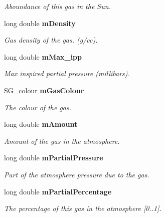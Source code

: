 \begin{CompactItemize}
\begin{CompactList}\small\item\em Aboundance of this gas in the Sun. \item\end{CompactList}\item 
long double {\bf m\-Density}\label{class_s_g___gas_p8}

\begin{CompactList}\small\item\em Gas density of the gas. (g/cc). \item\end{CompactList}\item 
long double {\bf m\-Max\_\-ipp}\label{class_s_g___gas_p9}

\begin{CompactList}\small\item\em Max inspired partial pressure (millibars). \item\end{CompactList}\item 
SG\_\-colour {\bf m\-Gas\-Colour}\label{class_s_g___gas_p10}

\begin{CompactList}\small\item\em The colour of the gas. \item\end{CompactList}\item 
long double {\bf m\-Amount}\label{class_s_g___gas_p11}

\begin{CompactList}\small\item\em Amount of the gas in the atmosphere. \item\end{CompactList}\item 
long double {\bf m\-Partial\-Pressure}\label{class_s_g___gas_p12}

\begin{CompactList}\small\item\em Part of the atmosphere pressure due to the gas. \item\end{CompactList}\item 
long double {\bf m\-Partial\-Percentage}\label{class_s_g___gas_p13}

\begin{CompactList}\small\item\em The percentage of this gas in the atmosphere [0..1]. \item\end{CompactList}\end{CompactItemize}


